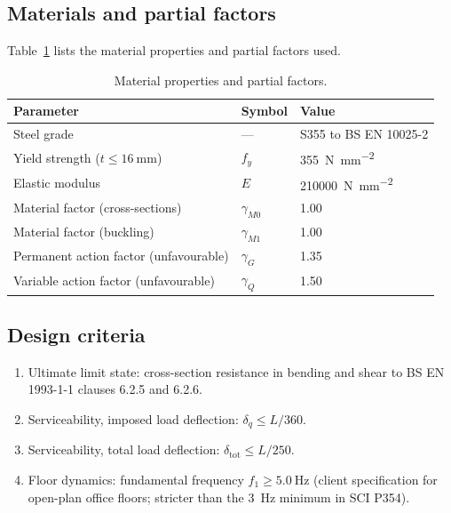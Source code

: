 \documentclass[11pt,a4paper]{article}
\begin{document}
\subsection{Materials and partial factors}

Table~\ref{tab:materials} lists the material properties and partial factors used.

\begin{table}[H]
  \centering
  \caption{Material properties and partial factors.}
  \label{tab:materials}
  \begin{tabular}{@{}lll@{}}
    \toprule
    Parameter & Symbol & Value \\
    \midrule
    Steel grade & --- & S355 to BS EN 10025-2 \\
    Yield strength ($t \le \qty{16}{\milli\metre}$) & $f_y$ & \qty{355}{\newton\per\milli\metre\squared} \\
    Elastic modulus & $E$ & \qty{210000}{\newton\per\milli\metre\squared} \\
    Material factor (cross-sections) & $\gamma_{M0}$ & 1.00 \\
    Material factor (buckling) & $\gamma_{M1}$ & 1.00 \\
    Permanent action factor (unfavourable) & $\gamma_G$ & 1.35 \\
    Variable action factor (unfavourable) & $\gamma_Q$ & 1.50 \\
    \bottomrule
  \end{tabular}
\end{table}

\subsection{Design criteria}

\begin{enumerate}[label=(\alph*)]
  \item Ultimate limit state: cross-section resistance in bending and shear to BS EN 1993-1-1 clauses 6.2.5 and 6.2.6.
  \item Serviceability, imposed load deflection: $\delta_q \le L/360$.
  \item Serviceability, total load deflection: $\delta_{\text{tot}} \le L/250$.
  \item Floor dynamics: fundamental frequency $f_1 \ge \qty{5.0}{\hertz}$ (client specification for open-plan office floors; stricter than the \qty{3}{\hertz} minimum in SCI P354).
\end{enumerate}
\end{document}
